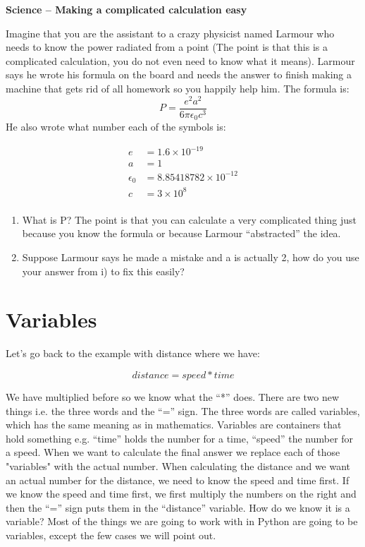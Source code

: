 \begin{exercise} \textbf{Science – Making a complicated calculation easy}

Imagine that you are the assistant to a crazy physicist named Larmour who needs to know the power
radiated from a point (The point is that this is a complicated calculation, you do not even need to
know what it means). Larmour says he wrote his formula on the board and needs the answer to
finish making a machine that gets rid of all homework so you happily help him. The formula is:
\[ P=\frac{e^2a^2}{6\pi\epsilon_0c^3}\]
He also wrote what number each of the symbols is:

\begin{align*}
e &= 1.6\times 10^{-19} \\
a &= 1\\
\epsilon_0 &= 8.85418782\times 10^{-12}\\
c &= 3\times 10^8\\
\end{align*}

\begin{enumerate}[label=\roman*]
\item What is P? The point is that you can calculate a very complicated thing just because you know the
formula or because Larmour “abstracted” the idea.
\item Suppose Larmour says he made a mistake and a is actually 2, how do you use your answer from i)
to fix this easily?
\end{enumerate}
\end{exercise}

\section{Variables}
Let’s go back to the example with distance where we have:

$$ distance = speed * time $$

We have multiplied before so we know what the “*” does. There are two new things i.e. the three words and the “=” sign. The three words are called variables, which has the same meaning as in mathematics. Variables are containers that hold something e.g. “time” holds the number for a time, “speed” the number for a speed. When we want to calculate the final answer we replace each of those "variables" with the actual number. When calculating the distance and we want an actual number for the distance, we need to know the speed and time first. If we know the speed and time first, we first multiply the numbers on the right and then the “=” sign puts them in the “distance” variable. How do we know it is a variable? Most of the things we are going to work with in Python are going to be variables, except the few cases we will point out.


